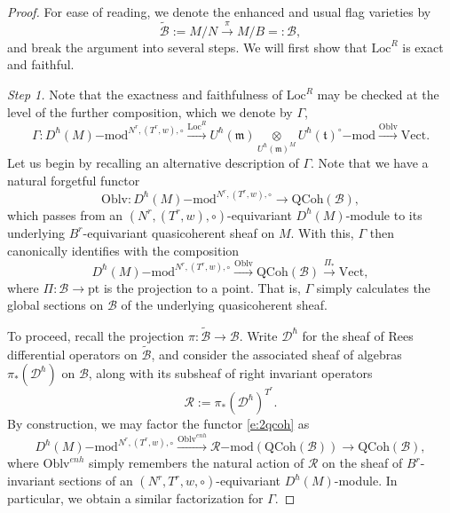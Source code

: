 \documentclass{amsart}
\theoremstyle{definition}
\newcommand{\fm}{\mathfrak{m}}
\newcommand{\lmod}{\on{-mod}}
\newcommand{\Oblv}{\on{Oblv}}
\newcommand{\ft}{\mathfrak{t}}
\newcommand{\Dh}{\mathscr{D}^\hbar}
\newcommand{\QCoh}{\on{QCoh}}
\newcommand{\on}{\mathrm}
\newcommand{\wsB}{\widetilde{\mathscr{B}}}
\newcommand{\sB}{\mathscr{B}}
\numberwithin{equation}{section}
\begin{document}
\begin{proof} For ease of reading, we denote the enhanced and usual flag varieties by $$\wsB  := M/N \xrightarrow{\pi} M/B =: \sB,$$ 
and break the argument into several steps.  We will first show that $\on{Loc}^R$ is exact and faithful.

{\noindent \em Step 1.} Note that the exactness and faithfulness of $\on{Loc}^R$ may be checked at the level of the further composition, which we denote by $\Gamma$, 
$$\Gamma: D^\hbar(M)\lmod^{N^r, (T^r, w), \circ} \xrightarrow{\on{Loc}^R} U^\hbar(\fm) \underset{U^\hbar(\fm)^M} \otimes U^\hbar(\ft)^\circ\lmod \xrightarrow{\on{Oblv}} \on{Vect}.$$
Let us begin by recalling an alternative description of $\Gamma$. Note that we have a natural forgetful functor \begin{equation} \label{e:2qcoh}\on{Oblv}: D^\hbar(M)\lmod^{N^r, (T^r, w), \circ} 
\rightarrow \QCoh(\sB),\end{equation}which passes from an $(N^r, (T^r, w), \circ)$-equivariant $D^\hbar(M)$-module to its underlying $B^r$-equivariant quasicoherent sheaf on $M$. With this, $\Gamma$ then canonically identifies with the composition 
$$D^\hbar(M)\lmod^{N^r, (T^r, w), \circ} \xrightarrow{\on{Oblv}} \QCoh(\sB) \xrightarrow{\Pi_*} \on{Vect},$$
where $\Pi: \sB \rightarrow \on{pt}$ is the projection to a point.  That is, $\Gamma$ simply calculates the global sections on $\sB$ of the underlying quasicoherent sheaf. 

To proceed, recall the projection $\pi: \wsB \rightarrow \sB$. Write $\Dh$ for the sheaf of Rees differential operators on $\wsB$, and consider the associated sheaf of algebras $\pi_*(\Dh)$ on $\sB$, along with its subsheaf of right invariant operators $$\mathscr{R} := \pi_* (\Dh)^{T^r}.$$ 
By construction, we may factor the functor \eqref{e:2qcoh} as 
\begin{equation} \label{e:2qcoh2} D^\hbar(M)\lmod^{N^r, (T^r, w), \circ} 
\xrightarrow{\Oblv^{enh}} \mathscr{R}\lmod(\QCoh(\sB)) \rightarrow \QCoh(\sB),\end{equation}
where $\on{Oblv}^{enh}$ simply remembers the natural action of $\mathscr{R}$ on the sheaf of $B^r$-invariant sections of an $(N^r, T^r, w, \circ)$-equivariant $D^\hbar(M)$-module. In particular, we  obtain a similar factorization for $\Gamma$. 


\end{proof}
\end{document}
